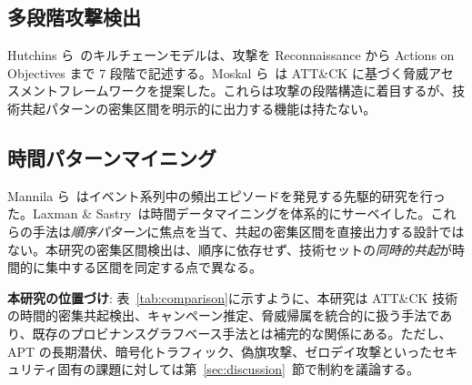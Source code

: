 \documentclass[11pt]{article}
\begin{document}
\subsection{多段階攻撃検出}

Hutchins ら~\cite{hutchins2011intelligence}のキルチェーンモデルは、攻撃を Reconnaissance から Actions on Objectives まで 7 段階で記述する。Moskal ら~\cite{moskal2020cyber}は ATT\&CK に基づく脅威アセスメントフレームワークを提案した。これらは攻撃の段階構造に着目するが、技術共起パターンの密集区間を明示的に出力する機能は持たない。

\subsection{時間パターンマイニング}

Mannila ら~\cite{mannila1997discovery}はイベント系列中の頻出エピソードを発見する先駆的研究を行った。Laxman \& Sastry~\cite{laxman2006survey}は時間データマイニングを体系的にサーベイした。これらの手法は\emph{順序パターン}に焦点を当て、共起の密集区間を直接出力する設計ではない。本研究の密集区間検出は、順序に依存せず、技術セットの\emph{同時的共起}が時間的に集中する区間を同定する点で異なる。

\textbf{本研究の位置づけ}: 表~\ref{tab:comparison}に示すように、本研究は ATT\&CK 技術の時間的密集共起検出、キャンペーン推定、脅威帰属を統合的に扱う手法であり、既存のプロビナンスグラフベース手法とは補完的な関係にある。ただし、APT の長期潜伏、暗号化トラフィック、偽旗攻撃、ゼロデイ攻撃といったセキュリティ固有の課題に対しては第~\ref{sec:discussion}~節で制約を議論する。
\end{document}
